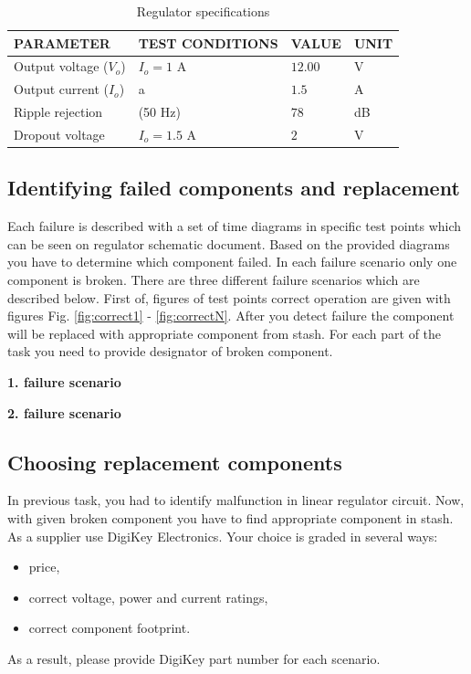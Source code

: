 \documentclass[a4paper]{article}
\begin{document}
\begin{table}[h!]
    \caption{Regulator specifications}
    \label{tab:spec}
    \begin{tabularx}{\linewidth}{|X|X|X|X|} \hline
    PARAMETER & TEST CONDITIONS & VALUE & UNIT \\ \hline 
    Output voltage ($V_o$)& $I_o = 1$ A & $12.00$ & V \\ \hline
    Output current ($I_o$) & a & $1.5$ & A \\ \hline
    Ripple rejection & (50 Hz) & $78$ & dB \\ \hline
   	Dropout voltage & $I_o = 1.5$ A & $2$ & V \\ \hline
    \end{tabularx}
\end{table}

\subsection{Identifying failed components and replacement}

Each failure is described with a set of time diagrams in specific test points 
which can be seen on regulator schematic document. Based on the provided 
diagrams you have to determine which component failed. In each failure scenario
only one component is broken. There are three different failure scenarios which
are described below. First of, figures of test points correct operation are 
given with figures Fig. \ref{fig:correct1} - \ref{fig:correctN}. After you 
detect failure the component will be replaced with appropriate component from
stash. For each part of the task you need to provide designator of broken 
component. 

\textbf{1. failure scenario} %

\textbf{2. failure scenario}  %

\subsection{Choosing replacement components}

In previous task, you had to identify malfunction in linear regulator circuit.
Now, with given broken component you have to find appropriate component in 
stash. As a supplier use DigiKey Electronics. Your choice is graded in 
several ways:
\begin{itemize}
\item price,
\item correct voltage, power and current ratings,
\item correct component footprint.
\end{itemize}
As a result, please provide DigiKey part number for each scenario.
\end{document}

